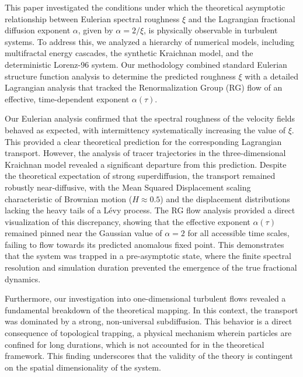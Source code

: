 \documentclass[]{article}
\begin{document}
This paper investigated the conditions under which the theoretical asymptotic relationship between Eulerian spectral roughness $\xi$ and the Lagrangian fractional diffusion exponent $\alpha$, given by $\alpha = 2/\xi$, is physically observable in turbulent systems. To address this, we analyzed a hierarchy of numerical models, including multifractal energy cascades, the synthetic Kraichnan model, and the deterministic Lorenz-96 system. Our methodology combined standard Eulerian structure function analysis to determine the predicted roughness $\xi$ with a detailed Lagrangian analysis that tracked the Renormalization Group (RG) flow of an effective, time-dependent exponent $\alpha(\tau)$.

Our Eulerian analysis confirmed that the spectral roughness of the velocity fields behaved as expected, with intermittency systematically increasing the value of $\xi$. This provided a clear theoretical prediction for the corresponding Lagrangian transport. However, the analysis of tracer trajectories in the three-dimensional Kraichnan model revealed a significant departure from this prediction. Despite the theoretical expectation of strong superdiffusion, the transport remained robustly near-diffusive, with the Mean Squared Displacement scaling characteristic of Brownian motion ($H \approx 0.5$) and the displacement distributions lacking the heavy tails of a Lévy process. The RG flow analysis provided a direct visualization of this discrepancy, showing that the effective exponent $\alpha(\tau)$ remained pinned near the Gaussian value of $\alpha=2$ for all accessible time scales, failing to flow towards its predicted anomalous fixed point. This demonstrates that the system was trapped in a pre-asymptotic state, where the finite spectral resolution and simulation duration prevented the emergence of the true fractional dynamics.

Furthermore, our investigation into one-dimensional turbulent flows revealed a fundamental breakdown of the theoretical mapping. In this context, the transport was dominated by a strong, non-universal subdiffusion. This behavior is a direct consequence of topological trapping, a physical mechanism wherein particles are confined for long durations, which is not accounted for in the theoretical framework. This finding underscores that the validity of the theory is contingent on the spatial dimensionality of the system.
\end{document}
